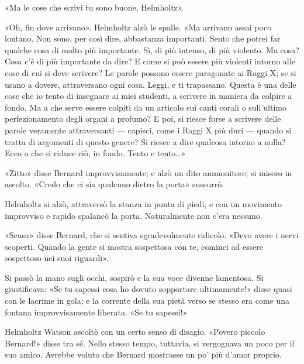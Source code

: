 \documentclass[
a5paper, %
10pt, %
twoside, 
onecolumn, %
openany, %
]{memoir}
\begin{document}
«Ma le cose che scrivi tu sono buone, Helmholtz».

«Oh, fin dove arrivano». Helmholtz alzò le spalle. «Ma arrivano assai poco lontano. Non sono, per così dire, abbastanza importanti. Sento che potrei far qualche cosa di molto più importante. Sì, di più intenso, di più violento. Ma cosa? Cosa c’è di più importante da dire? E come si può essere più violenti intorno alle cose di cui si deve scrivere? Le parole possono essere paragonate ai Raggi X; se si usano a dovere, attraversano ogni cosa. Leggi, e ti trapassano. Questa è una delle cose che io tento di insegnare ai miei studenti, a scrivere in maniera da colpire a fondo. Ma a che serve essere colpiti da un articolo sui canti corali o sull’ultimo perfezionamento degli organi a profumo? E poi, si riesce forse a scrivere delle parole veramente attraversanti — capisci, come i Raggi X più duri — quando si tratta di argomenti di questo genere? Si riesce a dire qualcosa intorno a nulla? Ecco a che si riduce ciò, in fondo. Tento e tento…»

«Zitto» disse Bernard improvvisamente; e alzò un dito ammonitore; si misero in ascolto. «Credo che ci sia qualcuno dietro la porta» sussurrò.

Helmholtz si alzò, attraversò la stanza in punta di piedi, e con un movimento improvviso e rapido spalancò la porta. Naturalmente non c’era nessuno.

«Scusa» disse Bernard, che si sentiva sgradevolmente ridicolo. «Devo avere i nervi scoperti. Quando la gente si mostra sospettosa con te, cominci ad essere sospettoso nei suoi riguardi».

Si passò la mano sugli occhi, sospirò e la sua voce divenne lamentosa. Si giustificava: «Se tu sapessi cosa ho dovuto sopportare ultimamente!» disse quasi con le lacrime in gola; e la corrente della sua pietà verso se stesso era come una fontana improvvisamente liberata. «Se tu sapessi!»

Helmholtz Watson ascoltò con un certo senso di disagio. «Povero piccolo Bernard!» disse tra sé. Nello stesso tempo, tuttavia, si vergognava un poco per il suo amico. Avrebbe voluto che Bernard mostrasse un po’ più d’amor proprio.

\chapter{\phantom{title}}

\begin{center}
    {\huge\textbf{}}
\end{center}
\end{document}
